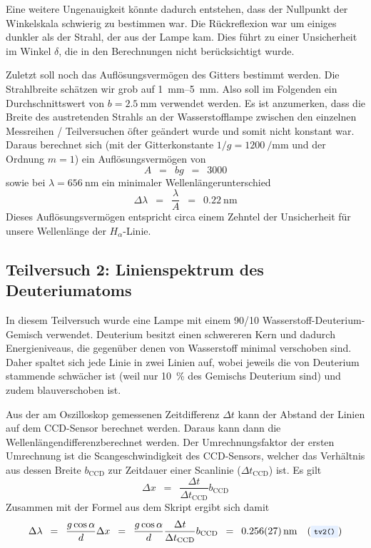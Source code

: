 \documentclass{article}
\newcommand{\widespace}{\enspace}
\newcommand{\wideeq}{\widespace = \widespace}
\newcommand{\coderef}[1]{%
    \text{\footnotesize \colorbox{codebg}{\texttt{#1()}}}%
}
\begin{document}
Eine weitere Ungenauigkeit könnte dadurch entstehen, dass der Nullpunkt der
Winkelskala schwierig zu bestimmen war. Die Rückreflexion war um einiges
dunkler als der Strahl, der aus der Lampe kam. Dies führt zu einer
Unsicherheit im Winkel $\delta$, die in den Berechnungen nicht berücksichtigt wurde.

Zuletzt soll noch das Auflösungsvermögen des Gitters bestimmt werden.
Die Strahlbreite schätzen wir grob auf \qtyrange{1}{5}{\mm}.
Also soll im Folgenden ein Durchschnittswert von $ b = \qty{2.5}{\mm}$
verwendet werden. Es ist anzumerken, dass die Breite des austretenden Strahls
an der Wasserstofflampe zwischen den einzelnen Messreihen / Teilversuchen
öfter geändert wurde und somit nicht konstant war.
Daraus berechnet sich (mit der Gitterkonstante $1 / g = \qty{1200}{\per\mm}$
und der Ordnung $m = 1$) ein Auflösungsvermögen von
\[
A \wideeq bg \wideeq 3000
\]
sowie bei $\lambda = \qty{656}{\nm}$ ein minimaler Wellenlängerunterschied
\[
     \Delta \lambda \wideeq \frac{\lambda}{A} \wideeq \qty{0.22}{\nm}
\]
Dieses Auflösungsvermögen entspricht circa einem Zehntel der Unsicherheit
für unsere Wellenlänge der $H_\alpha$-Linie.

\newpage

\subsection{Teilversuch 2: Linienspektrum des Deuteriumatoms}

In diesem Teilversuch wurde eine Lampe mit einem 90/10 Wasserstoff-Deuterium-Gemisch
verwendet. Deuterium besitzt einen schwereren Kern und dadurch Energieniveaus,
die gegenüber denen von Wasserstoff minimal verschoben sind.
Daher spaltet sich jede Linie in zwei Linien auf, wobei jeweils die von
Deuterium stammende schwächer ist (weil nur \qty{10}{\percent} des Gemischs
Deuterium sind) und zudem blauverschoben ist.

Aus der am Oszilloskop gemessenen Zeitdifferenz $\Delta t$ kann der Abstand der
Linien auf dem CCD-Sensor berechnet werden. Daraus kann dann die
Wellenlängendifferenzberechnet werden. Der Umrechnungsfaktor der ersten
Umrechnung ist die Scangeschwindigkeit des CCD-Sensors, welcher das Verhältnis
aus dessen Breite $b_\text{CCD}$ zur Zeitdauer einer Scanlinie
($\Delta t_\text{CCD}$) ist. Es gilt
\[
    \Delta x \wideeq \frac{\Delta t}{\Delta t_\text{CCD}} b_\text{CCD}
\]
Zusammen mit der Formel aus dem Skript ergibt sich damit
\[
    \Delta \lambda \wideeq \frac{g \cos \alpha}{d} \Delta x
    \wideeq \frac{g \cos \alpha}{d}
    \frac{\Delta t}{\Delta t_\text{CCD}} b_\text{CCD}
    \wideeq \qty{0.256 \pm 0.027}{\nm} \quad (\coderef{tv2})
\]
\end{document}
